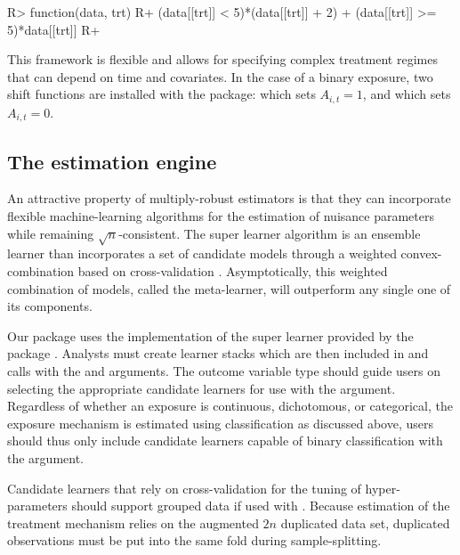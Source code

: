 \documentclass[]{jss}
\begin{document}
\begin{CodeChunk}

\begin{CodeInput}
R> function(data, trt) {
R+  (data[[trt]] < 5)*(data[[trt]] + 2) + (data[[trt]] >= 5)*data[[trt]]
R+ }
\end{CodeInput}

\end{CodeChunk}

This framework is flexible and allows for specifying complex treatment
regimes that can depend on time and covariates. In the case of a
binary exposure, two shift functions are installed with
the package:  which sets \(A_{i, t} = 1\), and
 which sets \(A_{i, t} = 0\).

\hypertarget{the-estimation-engine}{%
\subsection{The estimation engine}\label{the-estimation-engine}}

An attractive property of multiply-robust estimators is that they can
incorporate flexible machine-learning algorithms for the estimation of
nuisance parameters while remaining \(\sqrt{n}\)-consistent. The super
learner algorithm is an ensemble learner than incorporates a set of
candidate models through a weighted convex-combination based on
cross-validation \citep{laanSuperLearner2007}. Asymptotically, this
weighted combination of models, called the meta-learner, will outperform
any single one of its components.

Our package uses the implementation of the super learner provided by
the  package \citep{coyleSl3}. Analysts must create 
learner stacks which are then included in  and
 calls with the  and
 arguments. The outcome variable type should guide
users on selecting the appropriate candidate learners for use with the
 argument. Regardless of whether an exposure is
continuous, dichotomous, or categorical, the exposure mechanism is
estimated using classification as discussed above, users should thus
only include candidate learners capable of binary classification with
the  argument.

Candidate learners that rely on cross-validation
for the tuning of hyper-parameters should support grouped data if used with . Because
estimation of the treatment mechanism relies on the augmented \(2n\) duplicated
data set, duplicated observations must be put into the same fold during sample-splitting. 
\end{document}
